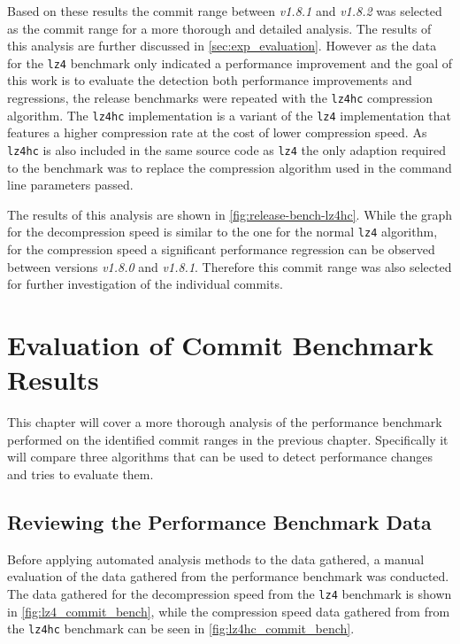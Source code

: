 \documentclass[	runningheads,
				a4paper]{llncs}
\begin{document}
	Based on these results the commit range between \textit{v1.8.1} and \textit{v1.8.2} was selected as the commit range for a more thorough and detailed analysis. The results of this analysis are further discussed in \autoref{sec:exp_evaluation}. However as the data for the \texttt{lz4} benchmark only indicated a performance improvement and the goal of this work is to evaluate the detection both performance improvements and regressions, the release benchmarks were repeated with the \texttt{lz4hc} compression algorithm. The \texttt{lz4hc} implementation is a variant of the \texttt{lz4} implementation that features a higher compression rate at the cost of lower compression speed. As \texttt{lz4hc} is also included in the same source code as \texttt{lz4} the only adaption required to the benchmark was to replace the compression algorithm used in the command line parameters passed.


	The results of this analysis are shown in \autoref{fig:release-bench-lz4hc}. While the graph for the decompression speed is similar to the one for the normal \texttt{lz4} algorithm, for the compression speed a significant performance regression can be observed between versions \textit{v1.8.0} and \textit{v1.8.1}. Therefore this commit range was also selected for further investigation of the individual commits.

\section{Evaluation of Commit Benchmark Results}
\label{sec:exp_evaluation}
This chapter will cover a more thorough analysis of the performance benchmark performed on the identified commit ranges in the previous chapter. Specifically it will compare three algorithms that can be used to detect performance changes and tries to evaluate them. 


\subsection{Reviewing the Performance Benchmark Data}
Before applying automated analysis methods to the data gathered, a manual evaluation of the data gathered from the performance benchmark was conducted. The data gathered for the decompression speed from the \texttt{lz4} benchmark is shown in \autoref{fig:lz4_commit_bench}, while the compression speed data gathered from from the \texttt{lz4hc} benchmark can be seen in \autoref{fig:lz4hc_commit_bench}.
\end{document}
